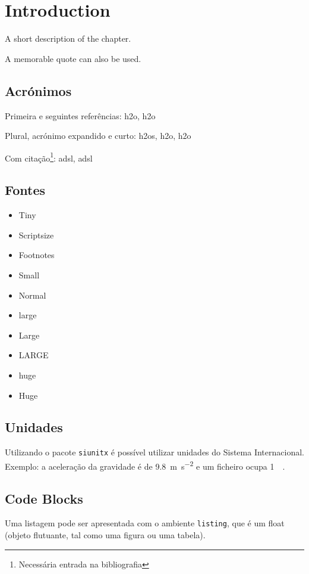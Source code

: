 \chapter{Introduction}%
\label{chapter:introduction}

\begin{introduction}
A short description of the chapter.

A memorable quote can also be used.
\end{introduction}



\section{Acrónimos}

Primeira e seguintes referências: \ac{h2o}, \ac{h2o}

Plural, acrónimo expandido e curto: \acp{h2o}, \acl{h2o}, \acs{h2o}

Com citação\footnote{Necessária entrada na bibliografia}: \ac{adsl}, \ac{adsl}


\section{Fontes}

\begin{itemize}
\item{\tiny Tiny}
\item{\scriptsize Scriptsize}
\item{\footnotesize Footnotes}
\item{\small Small}
\item{\normalsize Normal}
\item{\large large}
\item{\Large Large}
\item{\LARGE LARGE}
\item{\huge huge}
\item{\Huge Huge}
\end{itemize}

\section{Unidades}

Utilizando o pacote \verb|siunitx| é possível utilizar unidades do Sistema Internacional. Exemplo: a aceleração da gravidade é de \SI{9.8}{\metre\per\second\squared} e um ficheiro ocupa \SI{1}{\mebi\byte}. 

\section{Code Blocks}
Uma listagem pode ser apresentada com o ambiente \texttt{listing}, que é um float (objeto flutuante, tal como uma figura ou uma tabela).

